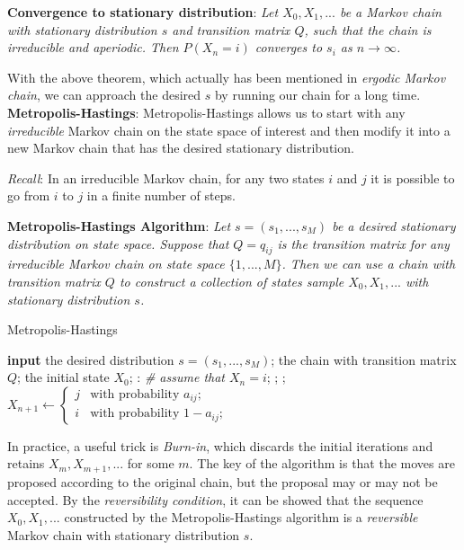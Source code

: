 \documentclass{progartcn}
\begin{document}
		\textbf{Convergence to stationary distribution}: \textit{Let $X_0, X_1,...$ be a Markov chain with stationary distribution $s$ and transition matrix $Q$, such that the chain is irreducible and aperiodic. Then $P(X_n=i)$ converges to $s_i$ as $n\to\infty$.}

		With the above theorem, which actually has been mentioned in \textit{ergodic Markov chain}, we can approach the desired $s$ by running our chain for a long time.\\

		\textbf{Metropolis-Hastings}: Metropolis-Hastings allows us to start with any \textit{irreducible} Markov chain on the state space of interest and then modify it into a new Markov chain that has the desired stationary distribution. 

		\textit{Recall}: In an irreducible Markov chain, for any two states $i$ and $j$ it is possible to go from $i$ to $j$ in a finite number of steps.

		\textbf{Metropolis-Hastings Algorithm}: \textit{Let $s=(s_1,...,s_M)$ be a desired stationary distribution on state space. Suppose that $Q=q_{ij}$ is the transition matrix for any irreducible Markov chain on state space $\{1,...,M\}$. Then we can use a chain with transition matrix $Q$ to construct a collection of states sample $X_0,X_1,...$ with stationary distribution $s$.}

    	\begin{algorithm}[H]
		\caption{Metropolis-Hastings}
		\label{alg: Metropolis-Hastings}
		\begin{algorithmic}[1]
			\State \textbf{input} the desired distribution $s=(s_1,...,s_M)$; the chain with transition matrix $Q$; the initial state $X_0$;
			: \textit{ \# assume that $X_n=i$};
				;
				;
				\State $X_{n+1}\gets\begin{cases}j & \text{with probability }a_{ij};\\i & \text{with probability }1-a_{ij};\end{cases}$
        	\EndFor
		\end{algorithmic}
		\end{algorithm}

		In practice, a useful trick is \textit{Burn-in}, which discards the initial iterations and retains $X_m,X_{m+1},...$ for some $m$. The key of the algorithm is that the moves are proposed according to the original chain, but the proposal may or may not be accepted. By the \textit{reversibility condition}, it can be showed that the sequence $X_0,X_1,...$ constructed by the Metropolis-Hastings algorithm is a \textit{reversible} Markov chain with stationary distribution $s$.\\
\end{document}
